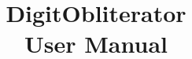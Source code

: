 \documentclass[a4paper,10pt]{article}
\title{
	\huge DigitObliterator \\
	\large User Manual
	\date{}
}
\begin{document}
	\begin{titlepage}
		\maketitle
		
		\tableofcontents
		
		\newpage  
		\newpage  
		\newpage 
		\newpage  
		\newpage  
		\newpage 
	\end{titlepage}
	
\end{document}
